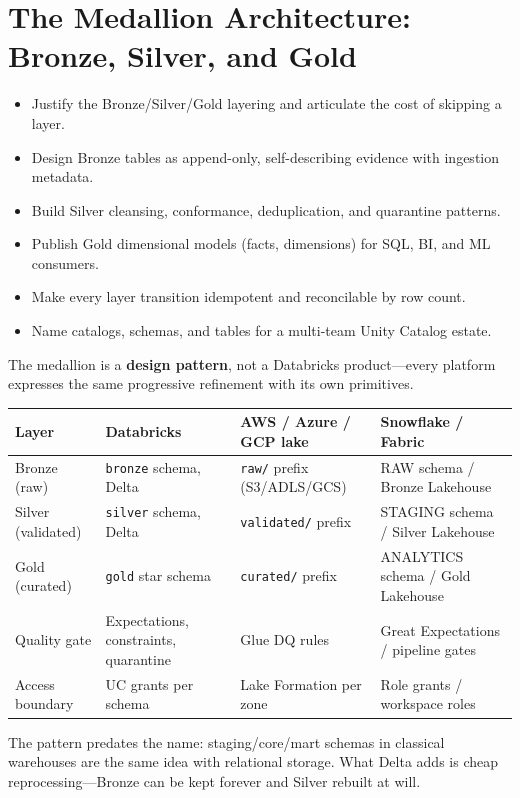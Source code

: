 \chapter{The Medallion Architecture: Bronze, Silver, and Gold}
%
%
\begin{objectives}
\begin{itemize}
    \item Justify the Bronze/Silver/Gold layering and articulate the cost of skipping a layer.
    \item Design Bronze tables as append-only, self-describing evidence with ingestion metadata.
    \item Build Silver cleansing, conformance, deduplication, and quarantine patterns.
    \item Publish Gold dimensional models (facts, dimensions) for SQL, BI, and ML consumers.
    \item Make every layer transition idempotent and reconcilable by row count.
    \item Name catalogs, schemas, and tables for a multi-team Unity Catalog estate.
\end{itemize}
\end{objectives}

\begin{crosscloud}
The medallion is a \textbf{design pattern}, not a Databricks product---every platform expresses the
same progressive refinement with its own primitives.

\vspace{2mm}
{\footnotesize
\begin{tabular}{@{}p{2.6cm}p{3.4cm}p{3.4cm}p{3.0cm}@{}}
\toprule
\textbf{Layer} & \textbf{Databricks} & \textbf{AWS / Azure / GCP lake} & \textbf{Snowflake / Fabric} \\
\midrule
Bronze (raw) & \texttt{bronze} schema, Delta & \texttt{raw/} prefix (S3/ADLS/GCS) & RAW schema / Bronze Lakehouse \\
Silver (validated) & \texttt{silver} schema, Delta & \texttt{validated/} prefix & STAGING schema / Silver Lakehouse \\
Gold (curated) & \texttt{gold} star schema & \texttt{curated/} prefix & ANALYTICS schema / Gold Lakehouse \\
Quality gate & Expectations, constraints, quarantine & Glue DQ rules & Great Expectations / pipeline gates \\
Access boundary & UC grants per schema & Lake Formation per zone & Role grants / workspace roles \\
\bottomrule
\end{tabular}}

\vspace{1mm}
The pattern predates the name: staging/core/mart schemas in classical warehouses are the same idea
with relational storage. What Delta adds is cheap reprocessing---Bronze can be kept forever and
Silver rebuilt at will.
\end{crosscloud}

